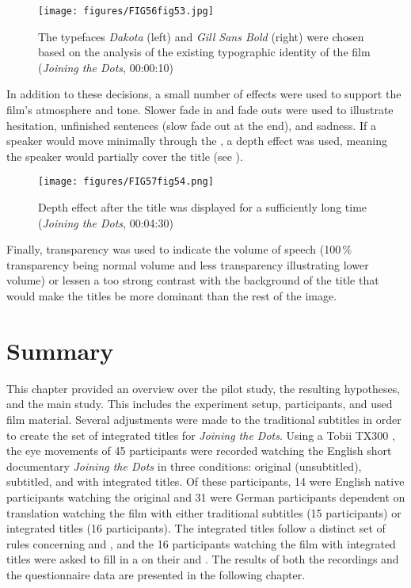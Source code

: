 \begin{figure}
\texttt{[image: figures/FIG56fig53.jpg]}
\caption{The typefaces \textit{Dakota} (left) and \textit{Gill Sans Bold} (right) were chosen based on the analysis of the existing typographic identity of the film (\textit{Joining the Dots}, 00:00:10)}
\label{fig:FIG56fig53}
\end{figure}

In addition to these  decisions, a small number of effects were used to support the film’s atmosphere and tone. Slower fade in and fade outs were used to illustrate hesitation, unfinished sentences (slow fade out at the end), and sadness. If a speaker would move minimally through the , a depth effect was used, meaning the speaker would partially cover the title (see ).

\begin{figure}
\texttt{[image: figures/FIG57fig54.png]}
\caption{Depth effect after the title was displayed for a sufficiently long time (\textit{Joining the Dots}, 00:04:30)}
\label{fig:FIG57fig54}
\end{figure}

\largerpage
Finally, transparency was used to indicate the volume of speech (100\,\% transparency being normal volume and less transparency illustrating lower volume) or lessen a too strong contrast with the background of the title that would make the titles be more dominant than the rest of the image.

\section{Summary}\label{sec:7.6}

This chapter provided an overview over the pilot study, the resulting hypotheses, and the main study. This includes the experiment setup, participants, and used film material. Several adjustments were made to the traditional subtitles in order to create the set of integrated titles for \textit{Joining the Dots}. Using a Tobii TX300 , the eye movements of 45 participants were recorded watching the English short documentary \textit{Joining the Dots} in three conditions: original (unsubtitled), subtitled, and with integrated titles. Of these participants, 14 were English native participants watching the original and 31 were German participants dependent on translation watching the film with either traditional subtitles (15 participants) or integrated titles (16 participants). The integrated titles follow a distinct set of rules concerning  and , and the 16 participants watching the film with integrated titles were asked to fill in a  on their  and . The results of both the  recordings and the questionnaire data are presented in the following chapter.

